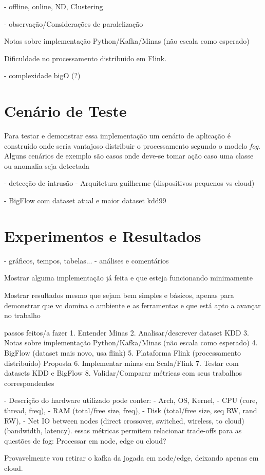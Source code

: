 - offline, online, ND, Clustering

- observação/Considerações de paralelização

Notas sobre implementação Python/Kafka/Minas (não escala como esperado)

Dificuldade no processamento distribuido em Flink.

- complexidade bigO (?)

\section{Cenário de Teste}

Para testar e demonstrar essa implementação um cenário de aplicação é construído
onde seria vantajoso distribuir o processamento segundo o modelo \emph{fog}. Alguns
cenários de exemplo são
casos onde deve-se tomar ação caso uma classe ou anomalia seja detectada



- detecção de intrusão
- Arquitetura guilherme (dispositivos pequenos vs cloud)
\cite{Cassales2019a}

- BigFlow com dataset atual e maior
dataset kdd99

\section{Experimentos e Resultados}
    - gráficos, tempos, tabelas...
    - análises e comentários


Mostrar alguma implementação já feita e que esteja funcionando minimamente

Mostrar resultados mesmo que sejam bem simples e básicos,
apenas para demonstrar que vc domina o ambiente e as ferramentas e
que está apto a avançar no trabalho 

passos feitos/a fazer
1. Entender Minas
2. Analisar/descrever dataset KDD
3. Notas sobre implementação Python/Kafka/Minas (não escala como esperado)
4. BigFlow (dataset mais novo, usa flink)
5. Plataforma Flink (processamento distribuído)
Proposta
6. Implementar minas em Scala/Flink
7. Testar com datasets KDD e BigFlow
8. Validar/Comparar métricas com seus trabalhos correspondentes

- Descrição do hardware utilizado pode conter:
    - Arch, OS, Kernel,
    - CPU (core, thread, freq),
    - RAM (total/free size, freq),
    - Disk (total/free size, seq RW, rand RW),
    - Net IO between nodes (direct crossover, switched, wireless, to cloud) (bandwidth, latency).
essas métricas permitem relacionar trade-offs para as questões de fog: Processar em node, edge ou cloud?

Provavelmente vou retirar o kafka da jogada em node/edge, deixando apenas em cloud.
